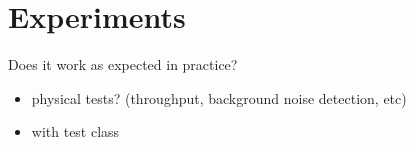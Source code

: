\chapter{Experiments}
Does it work as expected in practice?
\begin{itemize}
\item physical tests? (throughput, background noise detection, etc)
\item with test class
\end{itemize}